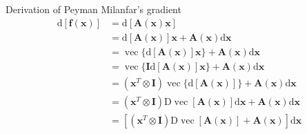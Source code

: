 Derivation of Peyman Milanfar's gradient
\begin{align*}
\mathrm{d}[\mathbf{f}(\mathbf{x})] & =\mathrm{d}[\mathbf{A}(\mathbf{x}) \mathbf{x}] \\
& =\mathrm{d}[\mathbf{A}(\mathbf{x})] \mathbf{x}+\mathbf{A}(\mathbf{x}) \mathrm{d} \mathbf{x} \\
& =\operatorname{vec}\{\mathrm{d}[\mathbf{A}(\mathbf{x})] \mathbf{x}\}+\mathbf{A}(\mathbf{x}) \mathrm{d} \mathbf{x} \\
& =\operatorname{vec}\{\mathbf{I} \mathrm{d}[\mathbf{A}(\mathbf{x})] \mathbf{x}\}+\mathbf{A}(\mathbf{x}) \mathrm{d} \mathbf{x} \\
& =\left(\mathbf{x}^T \otimes \mathbf{I}\right) \operatorname{vec}\{\mathrm{d}[\mathbf{A}(\mathbf{x})]\}+\mathbf{A}(\mathbf{x}) \mathrm{d} \mathbf{x} \\
& =\left(\mathbf{x}^T \otimes \mathbf{I}\right) \mathrm{D} \operatorname{vec}[\mathbf{A}(\mathbf{x})] \mathrm{d} \mathbf{x}+\mathbf{A}(\mathbf{x}) \mathrm{d} \mathbf{x} \\
& =\left[\left(\mathbf{x}^T \otimes \mathbf{I}\right) \mathrm{D} \operatorname{vec}[\mathbf{A}(\mathbf{x})]+\mathbf{A}(\mathbf{x})\right] \mathrm{d} \mathbf{x}
\end{align*}

